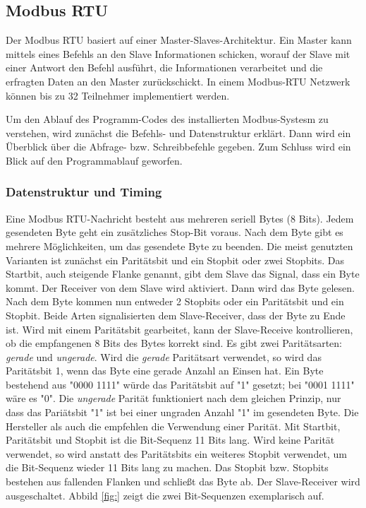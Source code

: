 \subsection{Modbus RTU}
\label{subsec:Modbus-RTU}

Der Modbus RTU basiert auf einer Master-Slaves-Architektur. Ein Master kann mittels eines Befehls an den Slave Informationen schicken, worauf der Slave mit einer Antwort den Befehl ausführt, die Informationen verarbeitet und die erfragten Daten an den Master zurückschickt. In einem Modbus-RTU Netzwerk können bis zu 32 Teilnehmer implementiert werden.

Um den Ablauf des Programm-Codes des installierten Modbus-Systesm zu verstehen, wird zunächst die Befehls- und Datenstruktur erklärt. Dann wird ein Überblick über die Abfrage- bzw. Schreibbefehle gegeben. Zum Schluss wird ein Blick auf den Programmablauf geworfen.

\subsubsection*{Datenstruktur und Timing}

Eine Modbus RTU-Nachricht besteht aus mehreren seriell Bytes (8 Bits). Jedem gesendeten Byte geht ein zusätzliches Stop-Bit voraus. Nach dem Byte gibt es mehrere Möglichkeiten, um das gesendete Byte zu beenden. Die meist genutzten Varianten ist zunächst ein Paritätsbit und ein Stopbit oder zwei Stopbits. 
Das Startbit, auch steigende Flanke genannt,  gibt dem Slave das Signal, dass ein Byte kommt. Der Receiver von dem Slave wird aktiviert. Dann wird das Byte gelesen. Nach dem Byte kommen nun entweder 2 Stopbits oder ein Paritätsbit und ein Stopbit. Beide Arten signalisierten dem Slave-Receiver, dass der Byte zu Ende ist. Wird mit einem Paritätsbit gearbeitet, kann der Slave-Receive kontrollieren, ob die empfangenen 8 Bits des Bytes korrekt sind. Es gibt zwei Paritätsarten: \textit{gerade} und \textit{ungerade}. Wird die \textit{gerade} Paritätsart verwendet, so wird das Paritätsbit 1, wenn das Byte eine gerade Anzahl an Einsen hat. Ein Byte bestehend aus "0000 1111" würde das Paritätsbit auf "1" gesetzt; bei "0001 1111" wäre es "0". Die \textit{ungerade} Parität funktioniert nach dem gleichen Prinzip, nur dass das Pariätsbit "1" ist bei einer ungraden Anzahl "1" im gesendeten Byte. Die Hersteller als auch die \textsc{\citeauthor{MODBUS.ORG2002}} empfehlen die Verwendung einer Parität. Mit Startbit, Paritätsbit und Stopbit ist die Bit-Sequenz 11 Bits lang. Wird keine Parität verwendet, so wird anstatt des Paritätsbits ein weiteres Stopbit verwendet, um die Bit-Sequenz wieder 11 Bits lang zu machen. 
Das Stopbit bzw. Stopbits bestehen aus fallenden Flanken und schließt das Byte ab. Der Slave-Receiver wird ausgeschaltet. Abbild \ref{fig:} zeigt die zwei Bit-Sequenzen exemplarisch auf. 

